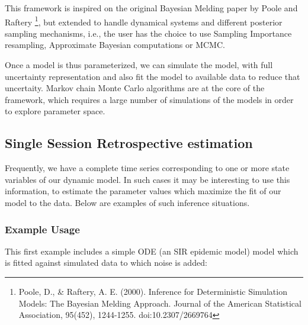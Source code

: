 \documentclass[a4paper,10pt,english]{manual}
\begin{document}
This framework is inspired on the original Bayesian Melding paper by Poole and Raftery \footnote{
Poole, D., \& Raftery, A. E. (2000). Inference for Deterministic Simulation Models: The Bayesian Melding Approach. Journal of the American Statistical Association, 95(452), 1244-1255. doi:10.2307/2669764
}, but extended to handle dynamical systems and different posterior sampling mechanisms, i.e., the user has the choice to use Sampling Importance resampling, Approximate Bayesian computations or MCMC.

Once a model is thus parameterized, we can simulate the model, with full uncertainty representation and also fit the model to available data to reduce that uncertaity. Markov chain Monte Carlo algorithms are at the core of the framework, which requires a large number of simulations of the models in order to explore parameter space.


\subsection{Single Session Retrospective estimation}

Frequently, we have a complete time series corresponding to one or more state variables of our dynamic model. In such cases it may be interesting to use this information, to estimate the parameter values which maximize the fit of our model to the data. Below are examples of such inference situations.


\subsubsection{Example Usage}

This first example includes a simple ODE (an SIR epidemic model) model which is fitted against simulated data to which noise is added:
\end{document}
